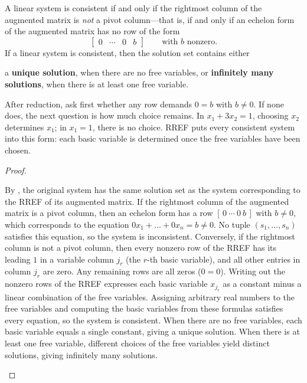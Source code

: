 \documentclass[10pt]{scrartcl}
\begin{document}
\begin{theorem*}
  A linear system is consistent if and only if the rightmost column of the augmented matrix is \emph{not} a pivot column---that is, if and only if an echelon form of the augmented matrix has no row of the form
  \[
    \begin{bmatrix} 0 & \cdots & 0 & b \end{bmatrix} \qquad\text{with }b\text{ nonzero.}
  \]
  If a linear system is consistent, then the solution set contains either
  \begin{enumerate}[(i)]
    \ii a \textbf{unique solution}, when there are no free variables, or
    \ii \textbf{infinitely many solutions}, when there is at least one free variable.
  \end{enumerate}
\end{theorem*}
\begin{ideabox}
  After reduction, ask first whether any row demands $0=b$ with $b\ne0$. If none does, the next question is how much choice remains. In $x_1+3x_2=1$, choosing $x_2$ determines $x_1$; in $x_1=1$, there is no choice. RREF puts every consistent system into this form: each basic variable is determined once the free variables have been chosen.
\end{ideabox}
\begin{proof}
  \begin{steps}
    \ii By , the original system has the same solution set as the system corresponding to the RREF of its augmented matrix.
    \ii If the rightmost column of the augmented matrix is a pivot column, then an echelon form has a row $[\,0\ \cdots\ 0\ b\,]$ with $b\ne 0$, which corresponds to the equation $0x_1+\dots+0x_n=b\ne 0$. No tuple $(s_1,\dots,s_n)$ satisfies this equation, so the system is inconsistent.
    \ii Conversely, if the rightmost column is not a pivot column, then every nonzero row of the RREF has its leading $1$ in a variable column $j_r$ (the $r$-th basic variable), and all other entries in column $j_r$ are zero. Any remaining rows are all zeros ($0=0$).
    \ii Writing out the nonzero rows of the RREF expresses each basic variable $x_{j_r}$ as a constant minus a linear combination of the free variables. Assigning arbitrary real numbers to the free variables and computing the basic variables from these formulas satisfies every equation, so the system is consistent.
    \ii When there are no free variables, each basic variable equals a single constant, giving a unique solution. When there is at least one free variable, different choices of the free variables yield distinct solutions, giving infinitely many solutions.
  \end{steps}
\end{proof}
\end{document}
